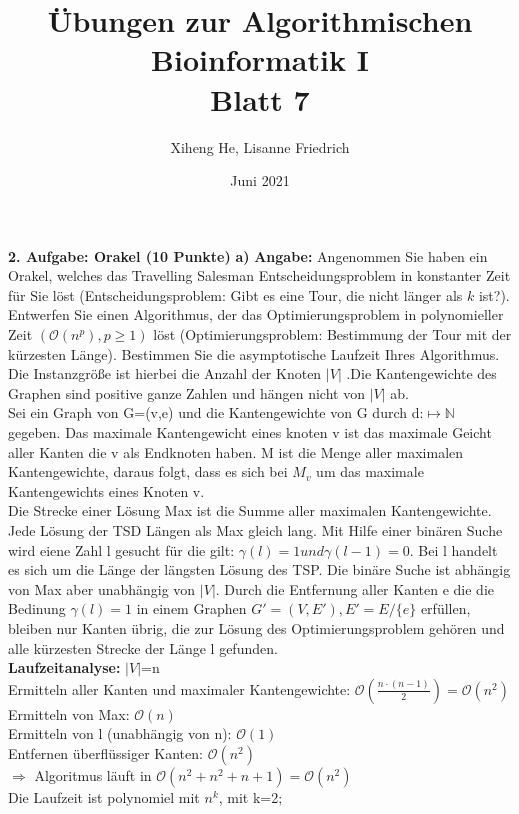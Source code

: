 \documentclass{article}
\title{Übungen zur Algorithmischen Bioinformatik I\\
Blatt 7}
\author{Xiheng He, Lisanne Friedrich}
\date{Juni 2021}
\begin{document}
\maketitle
\begin{flushleft}
\textbf{2. Aufgabe: Orakel (10 Punkte)}
\newline
\textbf{a)}
\newline
\textbf{Angabe:}
Angenommen Sie haben ein Orakel, welches das Travelling Salesman Entscheidungsproblem in
konstanter Zeit für Sie löst (Entscheidungsproblem: Gibt es eine Tour, die nicht länger als $k$ ist?). 
Entwerfen Sie einen Algorithmus, der das Optimierungsproblem in polynomieller Zeit $(\mathcal{O}(n^p), p \geq 1)$ löst 
(Optimierungsproblem: Bestimmung der Tour mit der kürzesten Länge). Bestimmen Sie die asymptotische Laufzeit Ihres Algorithmus. 
Die Instanzgröße ist hierbei die Anzahl der Knoten $\vert V \vert$ .Die Kantengewichte des Graphen sind positive 
ganze Zahlen und hängen nicht von $\vert V \vert$ ab.\\
Sei ein Graph von G=(v,e) und die Kantengewichte von G durch d:$\mapsto \mathbb{N} $ gegeben. Das maximale Kantengewicht eines knoten v ist das maximale Geicht aller Kanten die v als Endknoten haben.
M ist die Menge aller maximalen Kantengewichte, daraus folgt, dass es sich bei $M_v$ um das maximale Kantengewichts eines Knoten v.\\
Die Strecke einer Lösung 
Max ist die Summe aller maximalen Kantengewichte. Jede Lösung der TSD Längen als Max gleich lang. Mit Hilfe einer binären Suche wird eiene Zahl l gesucht für die gilt: $\gamma(l)=1 und \gamma (l-1)=0$. Bei l handelt es sich um die Länge der längsten Lösung des TSP. Die binäre Suche ist abhängig von Max aber unabhängig von $\vert V \vert$. Durch die Entfernung aller Kanten e die die Bedinung $\gamma(l)=1$ in einem Graphen $G'=(V,E'), E'=E / \{e\}$ erfüllen, bleiben nur Kanten übrig, die zur Lösung des Optimierungsproblem gehören und alle kürzesten Strecke der Länge l gefunden.\\
\textbf{Laufzeitanalyse: }$\vert V \vert$=n\\
Ermitteln aller Kanten und maximaler Kantengewichte: $\mathcal{O}(\frac{n\cdot(n-1)}{2})=\mathcal{O}(n^2)$\\
Ermitteln von Max: $\mathcal{O}(n)$\\
Ermitteln von l (unabhängig von n): $\mathcal{O}(1)$\\
Entfernen überflüssiger Kanten: $\mathcal{O}(n^2)$\\
$\Longrightarrow$ Algoritmus läuft in $\mathcal{O}(n^2+n^2+n+1)=\mathcal{O}(n^2)$\\
Die Laufzeit ist polynomiel mit $n^k$, mit k=2;\\
\end{flushleft}
\end{document}
